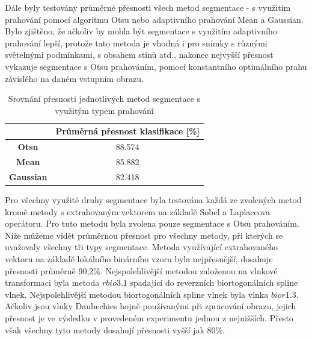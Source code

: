 Dále byly testovány průměrné přesnosti všech metod segmentace - s využitím prahování pomocí algoritmu Otsu nebo adaptivního prahování Mean a Gaussian. Bylo zjištěno, že ačkoliv by mohla být segmentace s využitím adaptivního prahování lepší, protože tato metoda je vhodná i pro snímky s různými světelnými podmínkami, s obsahem stínů atd., nakonec nejvyšší přesnost vykazuje segmentace s Otsu prahováním, pomocí konstantního optimálního prahu závislého na daném vstupním obrazu.

\capstartfalse
\begin{table}[!htbp]
\centering
\begin{tabular}{|c|c|}
\hline
                  & \textbf{Průměrná přesnost klasifikace {[}\%{]}} \\ \hline
\textbf{Otsu}     & 88.574                                         \\ \hline
\textbf{Mean}     & 85.882                                         \\ \hline
\textbf{Gaussian} & 82.418                                         \\ \hline
\end{tabular}
\caption{Srovnání přesnosti jednotlivých metod segmentace s využitým typem prahování}
\end{table}
\capstarttrue

 Pro všechny využité druhy segmentace byla testována každá ze zvolených metod kromě metody s extrahovaným vektorem na základě Sobel a Laplaceova operátoru. Pro tuto metodu byla zvolena pouze segmentace s Otsu prahováním. Níže můžeme vidět průměrnou přesnost pro všechny metody, při kterých se uvažovaly všechny tři typy segmentace. Metoda využívající extrahovaného vektoru na základě lokálního binárního vzoru byla nejpřesnější, dosahuje přesnosti průměrně 90,2\%. Nejspolehlivější metodou založenou na vlnkové transformaci byla metoda $rbio3.1$ spadající do reverzních biortogonálních spline vlnek. Nejspolehlivější metodou biortogonálních spline vlnek byla vlnka $bior1.3$. Ačkoliv jsou vlnky Daubechies hojně používanými při zpracování obrazu, jejich přesnost je ve výsledku v provedeném experimentu jednou z nejnižších. Přesto však všechny tyto metody dosahují přesnosti vyšší jak 80\%.
 
